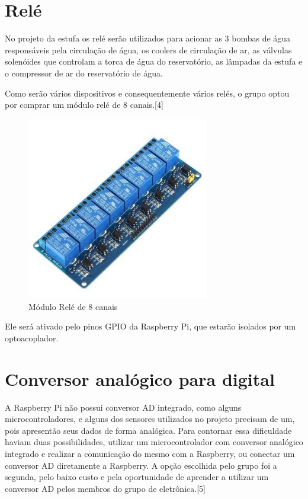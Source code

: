 \section{Relé}

No projeto da estufa os relé serão utilizados para acionar as 3 bombas de água responsáveis pela circulação de água, os coolers de circulação de ar, as válvulas solenóides que controlam a torca de água do reservatório, as lâmpadas da estufa e o compressor de ar do reservatório de água.

Como serão vários dispositivos e consequentemente vários relés, o grupo optou por comprar um módulo relé de 8 canais\cite{braga2012}.[4]

\begin{figure}[H]
	\centering
	\includegraphics[width=8cm]{figuras/modulo_re.jpg}
	\caption{Módulo Relé de 8 canais} \label{modulo_re}
\end{figure}

Ele será ativado pelo pinos GPIO da Raspberry Pi, que estarão isolados por um optoacoplador.

\section{Conversor analógico para digital}

A Raspberry Pi não possui conversor AD integrado, como alguns microcontroladores, e alguns dos sensores utilizados no projeto precisam de um, pois apresentão seus dados de forma analógica. Para contornar essa dificuldade haviam duas possibilidades, utilizar um microcontrolador com conversor analógico integrado e realizar a comunicação do mesmo com a Raspberry, ou conectar um conversor AD diretamente a Raspberry. A opção escolhida pelo grupo foi a segunda, pelo baixo custo e pela oportunidade de aprender a utilizar um conversor AD pelos membros do grupo de eletrônica\cite{nxp2013}.[5]
 
